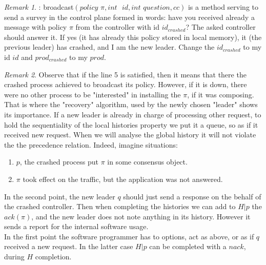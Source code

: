 \documentclass{article}
\theoremstyle{remark}
\newtheorem*{remark}{Remark}
\begin{document}
\begin{remark}: broadcast$(\textit{policy }\pi, int \textit{ }id,int \textit{ question},cc)$ is a method serving to send a survey in the control plane formed in words: have you received already a message with policy $\pi$ from the controller with id $id_{crashed}$? The asked controller should answer it. If yes (it has already this policy stored in local memory), it (the previous leader) has crashed, and I am the new leader. Change the $id_{crashed}$ to my id $id$ and $prod_{crashed}$ to my $prod$.
\end{remark}
\begin{remark}
Observe that if the line 5 is satisfied, then it means that there the crashed process achieved to broadcast its policy. However, if it is down, there were no other process to be "interested" in installing the $\pi$, if it was composing. That is where the "recovery" algorithm, used by the newly chosen "leader" shows its importance.
If a new leader is already in charge of processing other request, to hold the sequentiality of the local histories property we put it a queue, so as if it received new request. When we will analyse the global history it will not violate the the precedence relation. Indeed, imagine situations:
\begin{enumerate}
\item $p$, the crashed process put $\pi$ in some consensus object.
\item $\pi$ took effect on the traffic, but the application was not answered.
\end{enumerate}
In the second point, the new leader $q$ should just send a response on the behalf of the crashed controller. Then when completing the histories we can add to $H|p$ the $ack(\pi)$, and the new leader does not note anything in its history. However it sends a report for the internal software usage.\\
In the first point the software programmer has to options, act as above, or as if $q$ received a new request. In the latter case $H|p$ can be completed with a $nack$, during $H$ completion.
\end{remark}
\end{document}
